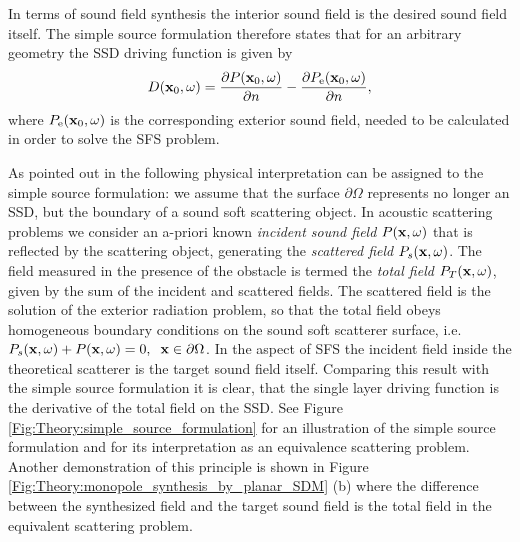 In terms of sound field synthesis the interior sound field is the desired sound field itself. The simple source formulation therefore states that for an arbitrary geometry the SSD driving function is given by
\begin{equation}
D(\mathbf{x}_0,\omega) = 
\frac{\partial P(\mathbf{x}_0,\omega)}{\partial n} - \frac{\partial P_{\mathrm{e}}(\mathbf{x}_0,\omega)}{\partial n},
\label{Eq:Theory:Source_strength}
\end{equation}
where $P_{\mathrm{e}}(\mathbf{x}_0,\omega)$ is the corresponding exterior sound field, needed to be calculated in order to solve the SFS problem.

\vspace{3mm}
As pointed out in \cite{Fazi2013:Equivalent_scattering, Fazi2010, Schultz2014:Comparing_approaches, Zotter2013:uniqueness} the following physical interpretation can be assigned to the simple source formulation: we assume that the surface $\partial \Omega$ represents no longer an SSD, but the boundary of a sound soft scattering object. In acoustic scattering problems we consider an a-priori known \emph{incident sound field} $P(\mathbf{x},\omega)$ that is reflected by the scattering object, generating the \emph{scattered field} $P_s(\mathbf{x},\omega)$.
The field measured in the presence of the obstacle is termed the \emph{total field} $P_T(\mathbf{x},\omega)$, given by the sum of the incident and scattered fields.
The scattered field is the solution of the exterior radiation problem, so that the total field obeys homogeneous boundary conditions on the sound soft scatterer surface, i.e. $P_s(\mathbf{x},\omega) + P(\mathbf{x},\omega) = 0, \hspace{.2cm} \mathbf{x} \in \partial \Omega$.
In the aspect of SFS the incident field inside the theoretical scatterer is the target sound field itself.
Comparing this result with the simple source formulation it is clear, that the single layer driving function is the derivative of the total field on the SSD.
See Figure \ref{Fig:Theory:simple_source_formulation} for an illustration of the simple source formulation and for its interpretation as an equivalence scattering problem.
Another demonstration of this principle is shown in Figure \ref{Fig:Theory:monopole_synthesis_by_planar_SDM} (b) where the difference between the synthesized field and the target sound field is the total field in the equivalent scattering problem.

